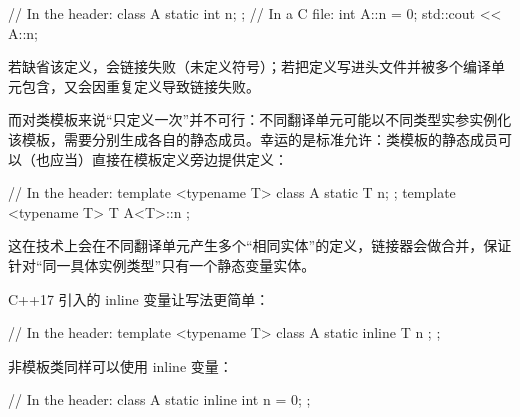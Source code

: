 \begin{code}
// In the header:
class A {
  static int n;
};
// In a C file:
int A::n = 0;
std::cout << A::n;
\end{code}

若缺省该定义，会链接失败（未定义符号）；若把定义写进头文件并被多个编译单元包含，又会因重复定义导致链接失败。

而对类模板来说“只定义一次”并不可行：不同翻译单元可能以不同类型实参实例化该模板，需要分别生成各自的静态成员。幸运的是标准允许：类模板的静态成员可以（也应当）直接在模板定义旁边提供定义：

\begin{code}
// In the header:
template <typename T> class A {
  static T n;
};
template <typename T> T A<T>::n {};
\end{code}

这在技术上会在不同翻译单元产生多个“相同实体”的定义，链接器会做合并，保证针对“同一具体实例类型”只有一个静态变量实体。

C++17 引入的 inline 变量让写法更简单：

\begin{code}
// In the header:
template <typename T> class A {
  static inline T n {};
};
\end{code}

非模板类同样可以使用 inline 变量：

\begin{code}
// In the header:
class A {
  static inline int n = 0;
};
\end{code}

